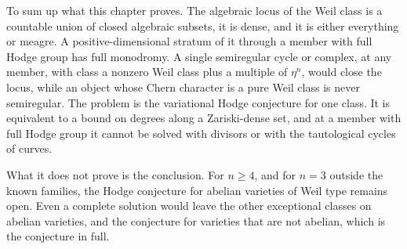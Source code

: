 To sum up what this chapter proves. The algebraic locus of the Weil class
is a countable union of closed algebraic subsets, it is dense, and it is
either everything or meagre. A positive-dimensional stratum of it through
a member with full Hodge group has full monodromy. A single semiregular
cycle or complex, at any member, with class a nonzero Weil class plus a
multiple of $\eta^{n}$, would close the locus, while an object whose Chern
character is a pure Weil class is never semiregular. The problem is the
variational Hodge conjecture for one class. It is equivalent to a bound on
degrees along a Zariski-dense set, and at a member with full Hodge group it
cannot be solved with divisors or with the tautological cycles of curves.

What it does not prove is the conclusion. For $n\ge4$, and for $n=3$
outside the known families, the Hodge conjecture for abelian varieties of
Weil type remains open. Even a complete solution would leave the other
exceptional classes on abelian varieties, and the conjecture for varieties
that are not abelian, which is the conjecture in full.
